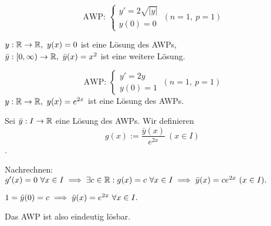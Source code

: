 \documentclass{article}
\begin{document}
\begin{beispiele}
\item $$\text{AWP: }\begin{cases}y'=2\sqrt{|y|}\\ y(0)=0\end{cases}\ (n=1,\ p=1)$$

$y:\mathbb{R}\to\mathbb{R},\ y(x)=0$ ist eine Lösung des AWPs,\\
$\bar{y}:[0,\infty)\to\MdR,\ \bar{y}(x)=x^2$ ist eine weitere Lösung.

\item $$\text{AWP: }\begin{cases}y'=2y\\ y(0)=1\end{cases}\ (n=1,\ p=1)$$
$y:\mathbb{R}\to\mathbb{R},\ y(x)=e^{2x}$ ist eine Lösung des AWPs.

Sei $\bar{y}:I\to\mathbb{R}$ eine Lösung des AWPs. Wir definieren $$g(x) := \frac{\bar{y}(x)}{e^{2x}}\ (x\in I)$$.

Nachrechnen: $g'(x)=0\ \forall x\in I \implies \exists c\in\mathbb{R}:g(x)=c\ \forall x\in I \implies \bar{y}(x) = ce^{2x}\ (x\in I).$

$1=\bar{y}(0)=c \folgt \bar{y}(x)=e^{2x}\ \forall x\in I.$

Das AWP ist also eindeutig lösbar.
\end{beispiele}
\end{document}
